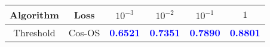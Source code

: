 \begin{table}[t]
\centering
\begin{tabularx}{.7\textwidth}{c|c|cccc}
\bf Algorithm & \bf Loss & $10^{-3}$ & $10^{-2}$ & $10^{-1}$ & $1$\\\hline\hline
\multirow{1}{*}{Threshold} & Cos-OS & \textcolor{blue}{\bf 0.6521} & \textcolor{blue}{\bf 0.7351} & \textcolor{blue}{\bf 0.7890} & \textcolor{blue}{\bf 0.8801}\\
\hline
\end{tabularx}
\end{table}